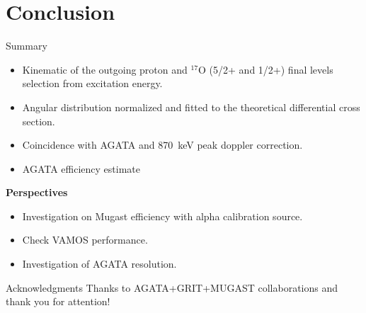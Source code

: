 \section{Conclusion}
\begin{frame}{Summary}
\vspace{-0.1\textheight}
\begin{itemize}	
		\item Kinematic of the outgoing proton and $^{17}$O (5/2+ and 1/2+) final levels selection from excitation energy.
		\item Angular distribution normalized and fitted to the theoretical differential cross section.
		\item Coincidence with AGATA and 870~keV peak doppler correction.
		\item AGATA efficiency estimate
\end{itemize}	
\textbf{Perspectives}
\begin{itemize}	
		\item Investigation on Mugast efficiency with alpha calibration source.
		\item Check VAMOS performance.
		\item Investigation of AGATA resolution.
\end{itemize}

\end{frame}

\begin{frame}{Acknowledgments}
\centering
Thanks to AGATA+GRIT+MUGAST collaborations and\\ thank you for attention!

\end{frame}